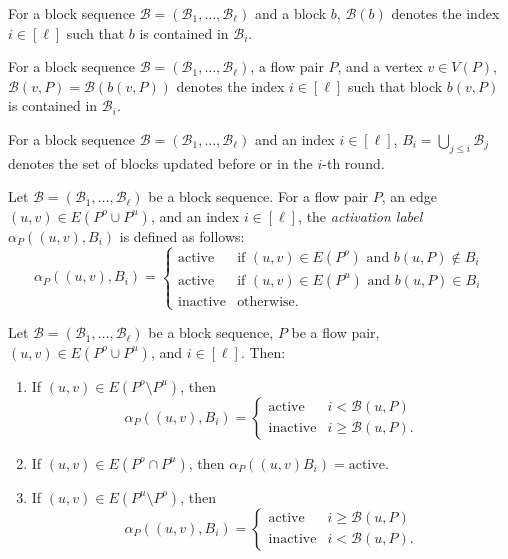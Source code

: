 \documentclass[fontsize=11pt,paper=a4]{book}
\begin{document}
\begin{notation}
For a block sequence \(\mathcal{B}=(\mathscr{B}_1,\dots,\mathscr{B}_{\ell})\) and a block \(b\), \(\mathcal{B}(b)\) denotes the index \(i\in[\ell]\) such that \(b\) is contained in \(\mathscr{B}_i\).
\label{orge2d4dec}
\end{notation}

\begin{notation}
For a block sequence \(\mathcal{B}=(\mathscr{B}_1,\dots,\mathscr{B}_{\ell})\), a flow pair \(P\), and a vertex \(v\in V(P)\), \(\mathcal{B}(v,P)=\mathcal{B}(b(v,P))\) denotes the index \(i\in[\ell]\) such that block \(b(v,P)\) is contained in \(\mathscr{B}_i\).
\label{orgb2a96fb}
\end{notation}

\begin{notation}
For a block sequence \(\mathcal{B}=(\mathscr{B}_1,\dots,\mathscr{B}_{\ell})\) and an index \(i\in[\ell]\), \(B_i=\bigcup_{j\leq i}\mathscr{B}_j\) denotes the set of blocks updated before or in the \(i\)-th round.
\label{orga242d7e}
\end{notation}

\begin{defn}
Let \(\mathcal{B}=(\mathscr{B}_1,\dots,\mathscr{B}_{\ell})\) be a block sequence.
For a flow pair \(P\), an edge \((u,v)\in E(P^o\cup P^u)\), and an index \(i\in[\ell]\), the \emph{activation label} \(\alpha_P((u,v),B_i)\) is defined as follows:
\[\alpha_P((u,v),B_i)=
\begin{cases}
\mathrm{active} & \text{if }(u,v)\in E(P^o)\text{ and }b(u,P)\notin B_i\\
\mathrm{active} & \text{if }(u,v)\in E(P^u)\text{ and }b(u,P)\in B_i\\
\mathrm{inactive} & \text{otherwise}.
\end{cases}\]
\label{org1921134}
\end{defn}

\begin{lem}
Let \(\mathcal{B}=(\mathscr{B}_1,\dots,\mathscr{B}_{\ell})\) be a block sequence, \(P\) be a flow pair, \((u,v)\in E(P^o\cup P^u)\), and \(i\in[\ell]\).
Then:

\begin{enumerate}
\item If \((u,v)\in E(P^o\setminus P^u)\), then
\[\alpha_P((u,v),B_i)=
   \begin{cases}
   \mathrm{active} & i<\mathcal{B}(u,P)\\
   \mathrm{inactive} & i\geq\mathcal{B}(u,P).
   \end{cases}\]

\item If \((u,v)\in E(P^o\cap P^u)\), then \(\alpha_P((u,v)B_i)=\mathrm{active}\).

\item If \((u,v)\in E(P^u\setminus P^o)\), then
\[\alpha_P((u,v),B_i)=
   \begin{cases}
   \mathrm{active} & i\geq\mathcal{B}(u,P)\\
   \mathrm{inactive} & i<\mathcal{B}(u,P).
   \end{cases}\]
\end{enumerate}
\label{org460d5ac}
\end{lem}
\end{document}
